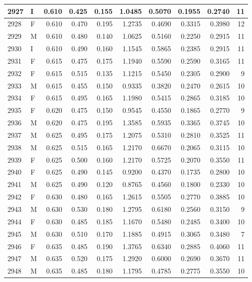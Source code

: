 \documentclass[9pt,twocolumn,twoside,]{pnas-new}
\begin{document}
\begin{tabular}{l|l|r|r|r|r|r|r|r|r}
\hline
2927 & I & 0.610 & 0.425 & 0.155 & 1.0485 & 0.5070 & 0.1955 & 0.2740 & 11\\
\hline
2928 & F & 0.610 & 0.470 & 0.195 & 1.2735 & 0.4690 & 0.3315 & 0.3980 & 12\\
\hline
2929 & M & 0.610 & 0.480 & 0.140 & 1.0625 & 0.5160 & 0.2250 & 0.2915 & 11\\
\hline
2930 & I & 0.610 & 0.490 & 0.160 & 1.1545 & 0.5865 & 0.2385 & 0.2915 & 11\\
\hline
2931 & F & 0.615 & 0.475 & 0.175 & 1.1940 & 0.5590 & 0.2590 & 0.3165 & 11\\
\hline
2932 & F & 0.615 & 0.515 & 0.135 & 1.1215 & 0.5450 & 0.2305 & 0.2900 & 9\\
\hline
2933 & M & 0.615 & 0.455 & 0.150 & 0.9335 & 0.3820 & 0.2470 & 0.2615 & 10\\
\hline
2934 & F & 0.615 & 0.495 & 0.165 & 1.1980 & 0.5415 & 0.2865 & 0.3185 & 10\\
\hline
2935 & F & 0.620 & 0.475 & 0.150 & 0.9545 & 0.4550 & 0.1865 & 0.2770 & 9\\
\hline
2936 & M & 0.620 & 0.475 & 0.195 & 1.3585 & 0.5935 & 0.3365 & 0.3745 & 10\\
\hline
2937 & M & 0.625 & 0.495 & 0.175 & 1.2075 & 0.5310 & 0.2810 & 0.3525 & 11\\
\hline
2938 & M & 0.625 & 0.515 & 0.165 & 1.2170 & 0.6670 & 0.2065 & 0.3115 & 10\\
\hline
2939 & F & 0.625 & 0.500 & 0.160 & 1.2170 & 0.5725 & 0.2070 & 0.3550 & 11\\
\hline
2940 & F & 0.625 & 0.490 & 0.145 & 0.9200 & 0.4370 & 0.1735 & 0.2800 & 10\\
\hline
2941 & M & 0.625 & 0.490 & 0.120 & 0.8765 & 0.4560 & 0.1800 & 0.2330 & 10\\
\hline
2942 & F & 0.630 & 0.480 & 0.165 & 1.2615 & 0.5505 & 0.2770 & 0.3885 & 10\\
\hline
2943 & M & 0.630 & 0.530 & 0.180 & 1.2795 & 0.6180 & 0.2560 & 0.3150 & 9\\
\hline
2944 & F & 0.630 & 0.485 & 0.185 & 1.1670 & 0.5480 & 0.2485 & 0.3400 & 10\\
\hline
2945 & M & 0.630 & 0.510 & 0.170 & 1.1885 & 0.4915 & 0.3065 & 0.3480 & 7\\
\hline
2946 & F & 0.635 & 0.485 & 0.190 & 1.3765 & 0.6340 & 0.2885 & 0.4060 & 11\\
\hline
2947 & M & 0.635 & 0.520 & 0.175 & 1.2920 & 0.6000 & 0.2690 & 0.3670 & 11\\
\hline
2948 & M & 0.635 & 0.485 & 0.180 & 1.1795 & 0.4785 & 0.2775 & 0.3550 & 10\\

\end{tabular}
\end{document}
